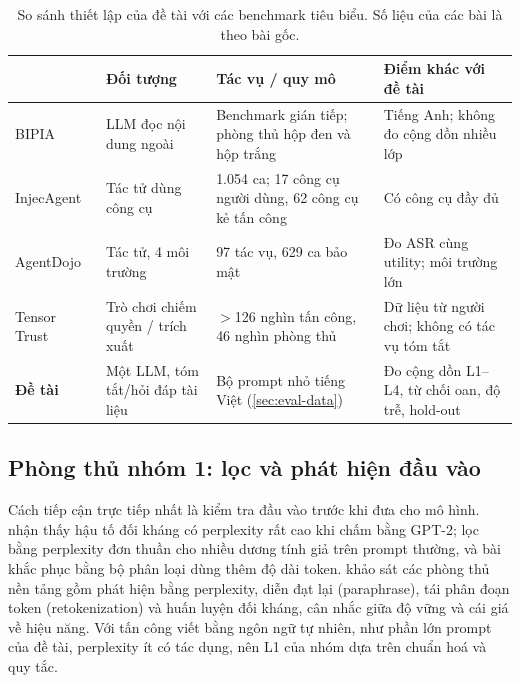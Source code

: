 \begin{table}[t]
\centering\small
\caption[So sánh với các benchmark tiêu biểu]{So sánh thiết lập của đề tài với các benchmark tiêu biểu. Số liệu của các bài là theo bài gốc.}\label{tab:related-bench}
\begin{tabularx}{\linewidth}{@{}p{2.6cm}YYY@{}}
\toprule
 & Đối tượng & Tác vụ / quy mô & Điểm khác với đề tài\\
\midrule
BIPIA~\citep{yi2025bipia} & LLM đọc nội dung ngoài & Benchmark gián tiếp; phòng thủ hộp đen và hộp trắng & Tiếng Anh; không đo cộng dồn nhiều lớp\\
InjecAgent~\citep{zhan2024injecagent} & Tác tử dùng công cụ & 1.054 ca; 17 công cụ người dùng, 62 công cụ kẻ tấn công & Có công cụ đầy đủ\\
AgentDojo~\citep{debenedetti2024agentdojo} & Tác tử, 4 môi trường & 97 tác vụ, 629 ca bảo mật & Đo ASR cùng utility; môi trường lớn\\
Tensor Trust~\citep{toyer2024tensortrust} & Trò chơi chiếm quyền / trích xuất & $>$126 nghìn tấn công, 46 nghìn phòng thủ & Dữ liệu từ người chơi; không có tác vụ tóm tắt\\
\textbf{Đề tài} & Một LLM, tóm tắt/hỏi đáp tài liệu & Bộ prompt nhỏ tiếng Việt (\cref{sec:eval-data}) & Đo cộng dồn L1--L4, từ chối oan, độ trễ, hold-out\\
\bottomrule
\end{tabularx}
\end{table}

\subsection{Phòng thủ nhóm 1: lọc và phát hiện đầu vào}
Cách tiếp cận trực tiếp nhất là kiểm tra đầu vào trước khi đưa cho mô hình. \citet{alon2023perplexity} nhận thấy hậu tố đối kháng có perplexity rất cao khi chấm bằng GPT-2; lọc bằng perplexity đơn thuần cho nhiều dương tính giả trên prompt thường, và bài khắc phục bằng bộ phân loại dùng thêm độ dài token. \citet{jain2023baseline} khảo sát các phòng thủ nền tảng gồm phát hiện bằng perplexity, diễn đạt lại (paraphrase), tái phân đoạn token (retokenization) và huấn luyện đối kháng, cân nhắc giữa độ vững và cái giá về hiệu năng. Với tấn công viết bằng ngôn ngữ tự nhiên, như phần lớn prompt của đề tài, perplexity ít có tác dụng, nên L1 của nhóm dựa trên chuẩn hoá và quy tắc.

